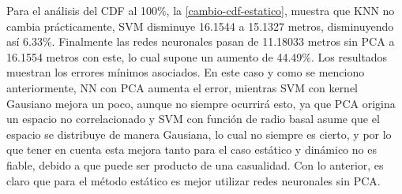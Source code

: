 Para el análisis del CDF al 100\%, la \autoref{cambio-cdf-estatico}, muestra que KNN no cambia prácticamente, SVM disminuye 16.1544 a 15.1327 metros, disminuyendo así 6.33\%. Finalmente las redes neuronales pasan de 11.18033 metros sin PCA a 16.1554 metros con este, lo cual supone un aumento de 44.49\%.  Los resultados muestran los errores mínimos asociados. En este caso y como se menciono anteriormente, NN con PCA aumenta el error, mientras SVM con kernel Gausiano mejora un poco, aunque no siempre ocurrirá esto, ya que PCA origina un espacio no correlacionado y SVM con función de radio basal asume que el espacio se distribuye de manera Gausiana, lo cual no siempre es cierto, y por lo que tener en cuenta esta mejora tanto para el caso estático y dinámico no es fiable, debido a que puede ser producto de una casualidad. Con lo anterior, es claro que para el método estático es mejor utilizar redes neuronales sin PCA.

